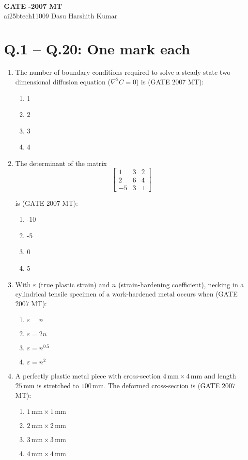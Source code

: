 \documentclass[12pt]{article}
\newcommand{\myvec}[1]{\begin{bmatrix}#1\end{bmatrix}}
\begin{document}
\begin{center}
    {\LARGE \textbf{GATE -2007 MT}} \\
    \vspace{1em}
    ai25btech11009 \qquad Dasu Harshith Kumar
\end{center}

\section*{Q.1 -- Q.20: One mark each}

\begin{enumerate}

\item The number of boundary conditions required to solve a steady-state two-dimensional diffusion equation ($\nabla^2 C = 0$) is (GATE 2007 MT):
    \begin{enumerate}
        \item 1
        \item 2
        \item 3
        \item 4
    \end{enumerate}

\item The determinant of the matrix
\[
\myvec{
1 & 3 & 2 \\
2 & 6 & 4 \\
-5 & 3 & 1
}
\]

is (GATE 2007 MT):
\begin{enumerate}
    \item -10
    \item -5
    \item 0
    \item 5
\end{enumerate}


\item With $\varepsilon$ (true plastic strain) and $n$ (strain-hardening coefficient), necking in a cylindrical tensile specimen of a work-hardened metal occurs when (GATE 2007 MT):
    \begin{enumerate}
        \item $\varepsilon = n$
        \item $\varepsilon = 2n$
        \item $\varepsilon = n^{0.5}$
        \item $\varepsilon = n^2$
    \end{enumerate}

\item A perfectly plastic metal piece with cross-section $4\,\mathrm{mm} \times 4\,\mathrm{mm}$ and length $25\,\mathrm{mm}$ is stretched to $100\,\mathrm{mm}$. The deformed cross-section is (GATE 2007 MT):
    \begin{enumerate}
        \item $1\,\mathrm{mm} \times 1\,\mathrm{mm}$
        \item $2\,\mathrm{mm} \times 2\,\mathrm{mm}$
        \item $3\,\mathrm{mm} \times 3\,\mathrm{mm}$
        \item $4\,\mathrm{mm} \times 4\,\mathrm{mm}$
    \end{enumerate}


\end{enumerate}
\end{document}
